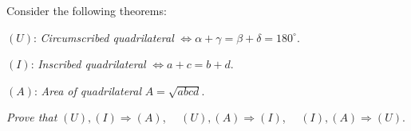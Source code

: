 Consider the following theorems:

$(U)$: \emph{Circumscribed quadrilateral} $\iff \alpha + \gamma = \beta + \delta = 180^\circ$.

$(I)$: \emph{Inscribed quadrilateral} $\iff a + c = b + d$.

$(A)$: \emph{Area of quadrilateral} $A = \sqrt{abcd}$.

\emph{Prove that} $(U), (I) \Rightarrow (A)$, $\quad (U), (A) \Rightarrow (I)$, $\quad (I), (A) \Rightarrow (U)$.

